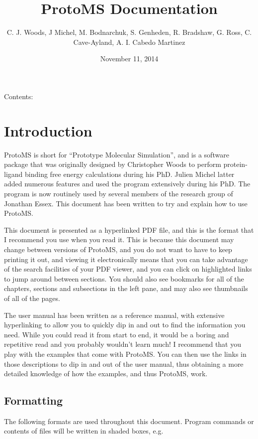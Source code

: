 \documentclass[letterpaper,10pt,english]{sphinxmanual}
\title{ProtoMS Documentation}
\date{November 11, 2014}
\author{C. J. Woods, J Michel, M. Bodnarchuk, S. Genheden, R. Bradshaw, G. Ross, C. Cave-Ayland, A. I. Cabedo Martinez}
\begin{document}
\maketitle
\tableofcontents
{}\label{index::doc}


Contents:


\chapter{Introduction}
\label{introduction:introduction}\label{introduction::doc}\label{introduction:welcome-to-protoms-s-documentation}
ProtoMS is short for “Prototype Molecular Simulation”, and is a software package that was originally designed by Christopher Woods to perform protein-ligand binding free energy calculations during his PhD. Julien Michel latter added numerous features and used the program extensively during his PhD. The program is now routinely used by several members of the research group of Jonathan Essex. This document has been written to try and explain how to use ProtoMS.

This document is presented as a hyperlinked PDF file, and this is the format that I recommend you use when you read it. This is because this document may change between versions of ProtoMS, and you do not want to have to keep printing it out, and viewing it electronically means that you can take advantage of the search facilities of your PDF viewer, and you can click on highlighted links to jump around between sections. You should also see bookmarks for all of the chapters, sections and subsections in the left pane, and may also see thumbnails of all of the pages.

The user manual has been written as a reference manual, with extensive hyperlinking to allow you to quickly dip in and out to find the information you need. While you could read it from start to end, it would be a boring and repetitive read and you probably wouldn’t learn much! I recommend that you play with the examples that come with ProtoMS. You can then use the links in those descriptions to dip in and out of the user manual, thus obtaining a more detailed knowledge of how the examples, and thus ProtoMS, work.


\section{Formatting}
\label{introduction:formatting}
The following formats are used throughout this document. Program commands or contents of files will be written in shaded boxes, e.g.
\end{document}
